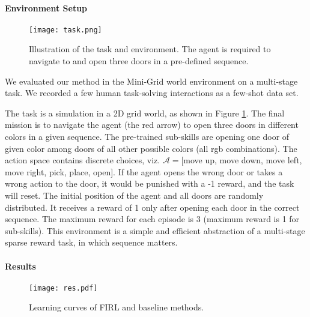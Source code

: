 \documentclass[conference]{IEEEtran}
\begin{document}
\paragraph{Environment Setup}
\begin{figure}[h]
    \centering
     \texttt{[image: task.png]}
    \caption{Illustration of the task and environment. The agent is required to navigate to and open three doors in a pre-defined sequence.}
    \label{fig:task}
\end{figure}


We evaluated our method in the Mini-Grid world environment \cite{chevalier2018minimalistic} on a multi-stage task. We recorded a few human task-solving interactions as a few-shot data set. 

The task is a simulation in a 2D grid world, as shown in Figure \ref{fig:task}. The final mission is to navigate the agent (the red arrow) to open three doors in different colors in a given sequence. The pre-trained sub-skills are opening one door of given color among doors of all other possible colors (all rgb combinations). The action space contains discrete choices, viz. $\mathcal{A}=$[move up, move down, move left, move right, pick, place, open]. If the agent opens the wrong door or takes a wrong action to the door, it would be punished with a -1 reward, and the task will reset. The initial position of the agent and all doors are randomly distributed. It receives a reward of 1 only after opening each door in the correct sequence. The maximum reward for each episode is 3 (maximum reward is 1 for sub-skills).  This environment is a simple and efficient abstraction of a multi-stage sparse reward task, in which sequence matters.

\paragraph{Results}
\begin{figure}[h]
    \centering
     \texttt{[image: res.pdf]}
    \caption{Learning curves of FIRL and baseline methods.}
    \label{fig:res}
\end{figure}
\end{document}
